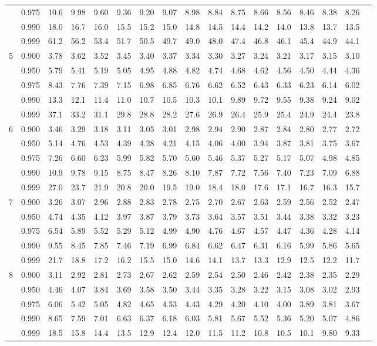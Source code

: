 {\begin{center}
\begin{tabular}{rrr@{\,}r@{\,}r@{\,}r@{\,}r@{\,}r@{\,}r@{\,}r
                   @{\,}r@{\,}r@{\,}r@{\,}r@{\,}r@{\,}r@{\,}r}
 &0.975&10.6&9.98&9.60&9.36&9.20&9.07&8.98&8.84&8.75&8.66&8.56&8.46&8.38&8.26\\
 &0.990&18.0&16.7&16.0&15.5&15.2&15.0&14.8&14.5&14.4&14.2&14.0&13.8&13.7&13.5\\
 &0.999&61.2&56.2&53.4&51.7&50.5&49.7&49.0&48.0&47.4&46.8&46.1&45.4&44.9&44.1\\
5&0.900&3.78&3.62&3.52&3.45&3.40&3.37&3.34&3.30&3.27&3.24&3.21&3.17&3.15&3.10\\
 &0.950&5.79&5.41&5.19&5.05&4.95&4.88&4.82&4.74&4.68&4.62&4.56&4.50&4.44&4.36\\
 &0.975&8.43&7.76&7.39&7.15&6.98&6.85&6.76&6.62&6.52&6.43&6.33&6.23&6.14&6.02\\
 &0.990&13.3&12.1&11.4&11.0&10.7&10.5&10.3&10.1&9.89&9.72&9.55&9.38&9.24&9.02\\
 &0.999&37.1&33.2&31.1&29.8&28.8&28.2&27.6&26.9&26.4&25.9&25.4&24.9&24.4&23.8\\
6&0.900&3.46&3.29&3.18&3.11&3.05&3.01&2.98&2.94&2.90&2.87&2.84&2.80&2.77&2.72\\
 &0.950&5.14&4.76&4.53&4.39&4.28&4.21&4.15&4.06&4.00&3.94&3.87&3.81&3.75&3.67\\
 &0.975&7.26&6.60&6.23&5.99&5.82&5.70&5.60&5.46&5.37&5.27&5.17&5.07&4.98&4.85\\
 &0.990&10.9&9.78&9.15&8.75&8.47&8.26&8.10&7.87&7.72&7.56&7.40&7.23&7.09&6.88\\
 &0.999&27.0&23.7&21.9&20.8&20.0&19.5&19.0&18.4&18.0&17.6&17.1&16.7&16.3&15.7\\
7&0.900&3.26&3.07&2.96&2.88&2.83&2.78&2.75&2.70&2.67&2.63&2.59&2.56&2.52&2.47\\
 &0.950&4.74&4.35&4.12&3.97&3.87&3.79&3.73&3.64&3.57&3.51&3.44&3.38&3.32&3.23\\
 &0.975&6.54&5.89&5.52&5.29&5.12&4.99&4.90&4.76&4.67&4.57&4.47&4.36&4.28&4.14\\
 &0.990&9.55&8.45&7.85&7.46&7.19&6.99&6.84&6.62&6.47&6.31&6.16&5.99&5.86&5.65\\
 &0.999&21.7&18.8&17.2&16.2&15.5&15.0&14.6&14.1&13.7&13.3&12.9&12.5&12.2&11.7\\
8&0.900&3.11&2.92&2.81&2.73&2.67&2.62&2.59&2.54&2.50&2.46&2.42&2.38&2.35&2.29\\
 &0.950&4.46&4.07&3.84&3.69&3.58&3.50&3.44&3.35&3.28&3.22&3.15&3.08&3.02&2.93\\
 &0.975&6.06&5.42&5.05&4.82&4.65&4.53&4.43&4.29&4.20&4.10&4.00&3.89&3.81&3.67\\
 &0.990&8.65&7.59&7.01&6.63&6.37&6.18&6.03&5.81&5.67&5.52&5.36&5.20&5.07&4.86\\
 &0.999&18.5&15.8&14.4&13.5&12.9&12.4&12.0&11.5&11.2&10.8&10.5&10.1&9.80&9.33
\end{tabular}
\end{center}

}
